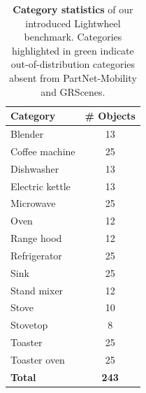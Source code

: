 \begin{table}[t]
    \centering
    \small
    \setlength{\tabcolsep}{6pt}
    \renewcommand{\arraystretch}{1.05}
    \begin{tabular}{@{}lc@{}}
    \toprule
    \textbf{Category} & \textbf{\# Objects} \\
    \midrule
    \cellcolor{green!15}Blender & \cellcolor{green!15}13 \\
    Coffee machine & 25 \\
    Dishwasher & 13 \\
    Electric kettle & 13 \\
    Microwave & 25 \\
    Oven & 12 \\
    \cellcolor{green!15}Range hood & \cellcolor{green!15}12 \\
    Refrigerator & 25 \\
    Sink & 25 \\
    \cellcolor{green!15}Stand mixer & \cellcolor{green!15}12 \\
    \cellcolor{green!15}Stove & \cellcolor{green!15}10 \\
    \cellcolor{green!15}Stovetop & \cellcolor{green!15}8 \\
    Toaster & 25 \\
    Toaster oven & 25 \\
    \textbf{Total} & \textbf{243} \\
    \bottomrule
    \end{tabular}
    \caption{
    \textbf{Category statistics} of our introduced Lightwheel benchmark.
    Categories highlighted in \colorbox{green!15}{green} indicate out-of-distribution categories absent from PartNet-Mobility and GRScenes.
    }
    \label{tab:lightwheel-category-split}
    \end{table}
    